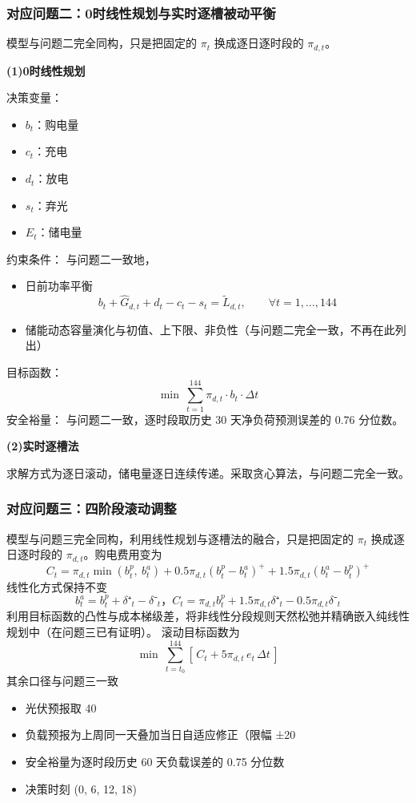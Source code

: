 \documentclass{cumcmthesis}
\begin{document}
        \subsubsection{对应问题二：0时线性规划与实时逐槽被动平衡}
        模型与问题二完全同构，只是把固定的 $\pi_t$ 换成逐日逐时段的 $\pi_{d,t}$。

        \noindent\textbf{(1)0时线性规划}

        决策变量：
        \begin{itemize}
            \item $b_t$：购电量
            \item $c_t$：充电
            \item $d_t$：放电
            \item $s_t$：弃光
            \item $E_t$：储电量
        \end{itemize}
        约束条件：
        与问题二一致地，
        \begin{itemize}
            \item 日前功率平衡
                  \[
                  b_t + \hat{G}_{d,t} + d_t - c_t - s_t = \tilde{L}_{d,t},\qquad \forall t = 1,\dots,144
                  \]
            \item 储能动态容量演化与初值、上下限、非负性（与问题二完全一致，不再在此列出）
        \end{itemize}
        目标函数：
        \[
        \min\ \sum_{t=1}^{144}\pi_{d,t}\cdot b_t\cdot\Delta t
        \]
        安全裕量：
        与问题二一致，逐时段取历史 30 天净负荷预测误差的 0.76 分位数。

        \noindent\textbf{(2)实时逐槽法}
        
        求解方式为逐日滚动，储电量逐日连续传递。采取贪心算法，与问题二完全一致。
        \subsubsection{对应问题三：四阶段滚动调整}
        模型与问题三完全同构，利用线性规划与逐槽法的融合，只是把固定的 $\pi_t$ 换成逐日逐时段的 $\pi_{d,t}$。购电费用变为
        \[
        C_t = \pi_{d,t}\min(b^{p}_t,\ b^{a}_t) + 0.5\pi_{d,t}\left(b^{p}_t - b^{a}_t\right)^{+} + 1.5\pi_{d,t}\left(b^{a}_t - b^{p}_t\right)^{+}
        \] 
        线性化方式保持不变
        \[
        b^a_t = b^p_t + δ⁺_t − δ⁻_t，C_t = π_{d,t}b^p_t + 1.5π_{d,t}δ⁺_t − 0.5π_{d,t}δ⁻_t
        \]
        利用目标函数的凸性与成本梯级差，将非线性分段规则天然松弛并精确嵌入纯线性规划中（在问题三已有证明）。
        滚动目标函数为
        \[
        \min\ \sum_{t=t_0}^{144}\left[\,C_t + 5\pi_{d,t}\,e_t\,\Delta t\,\right]
        \]
        其余口径与问题三一致
        \begin{itemize}
            \item 光伏预报取 40%
            \item 负载预报为上周同一天叠加当日自适应修正（限幅 ±20%
            \item 安全裕量为逐时段历史 60 天负载误差的 0.75 分位数
            \item 决策时刻 (0, 6, 12, 18)
        \end{itemize}
        
\end{document}
